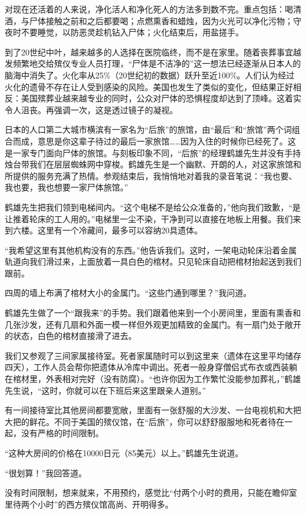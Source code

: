 \documentclass[12pt,oneside]{book}
\begin{document}
\begin{bookref}[frametitle={\cite{好好告别}}]
对现在还活着的人来说，净化活人和净化死人的方法多到数不完。重点包括：喝清酒，与尸体接触之前和之后都要喝；点燃熏香和蜡烛，因为火光可以净化污物；守夜时不要睡觉，以防恶灵趁机钻入尸体；火化结束后，用盐搓手。

到了20世纪中叶，越来越多的人选择在医院临终，而不是在家里。随着丧葬事宜越发频繁地交给殡仪专业人员打理，“尸体是不洁净的”这一想法已经逐渐从日本人的脑海中消失了。火化率从25\%（20世纪初的数据）跃升至近100\%。人们认为经过火化的遗骨不存在让人受到感染的风险。美国也发生了类似的变化，但结果正好相反：美国殡葬业越来越专业的同时，公众对尸体的恐惧程度却达到了顶峰。这着实令人沮丧。再强调一次，这是透过镜子的凝视。

日本的人口第二大城市横滨有一家名为“后旅”的旅馆，由“最后”和“旅馆”两个词组合而成，意思是你这辈子待过的最后一家旅馆……因为入住的时候你已经死了。这是一家专门面向尸体的旅馆。与刻板印象不同，“后旅”的经理鹤雄先生并没有手持烛台带我们在层层蜘蛛网中穿梭。鹤雄先生是一个幽默、开朗的人，对这家旅馆和所提供的服务充满了热情。参观结束后，我悄悄地对着我的录音笔说：“我也要、我也要，我也想要一家尸体旅馆。”

鹤雄先生把我们领到电梯间内。“这个电梯不是给公众准备的，”他向我们致歉，“是让推着轮床的工人用的。”电梯里一尘不染，干净到可以直接在地板上用餐。我们来到六楼。这里有一个冷藏间，最多可以容纳20具遗体。

“我希望这里有其他机构没有的东西。”他告诉我们。这时，一架电动轮床沿着金属轨道向我们滑过来，上面放着一具白色的棺材。只见轮床自动把棺材抬起送到我们跟前。

四周的墙上布满了棺材大小的金属门。“这些门通到哪里？”我问道。

鹤雄先生做了一个“跟我来”的手势。我们跟着他来到一个小房间里，里面有熏香和几张沙发，还有几扇和外面一模一样但外观更加精致的金属门。有一扇门处于敞开的状态，白色的棺材直接滑了进去。

我们又参观了三间家属接待室。死者家属随时可以到这里来（遗体在这里平均储存四天），工作人员会帮你把遗体从冷库中调出。死者一般身穿僧侣式布衣或西装躺在棺材里，外表相对完好（没有防腐）。“也许你因为工作繁忙没能参加葬礼，”鹤雄先生说，“这时，你就可以在下班后来这里跟亲人道别。”

有一间接待室比其他房间都要宽敞，里面有一张舒服的大沙发、一台电视机和大把大把的鲜花。不同于美国的殡仪馆，在“后旅”，你可以舒舒服服地和死者待在一起，没有严格的时间限制。

“这种大房间的价格在10000日元（85美元）以上。”鹤雄先生说道。

“很划算！”我回答道。

没有时间限制，想来就来，不用预约，感觉比“付两个小时的费用，只能在瞻仰室里待两个小时”的西方殡仪馆高尚、开明得多。


\end{bookref}
\end{document}

